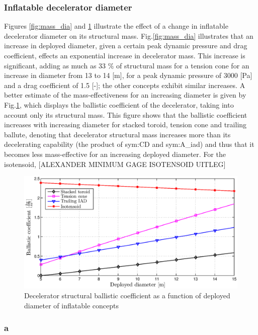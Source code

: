 \subsubsection{Inflatable decelerator diameter}
Figures \ref{fig:mass_dia} and \ref{fig:bc_dia} illustrate the effect of a change in inflatable decelerator diameter on its structural mass. Fig.\ref{fig:mass_dia} illustrates that an increase in deployed diameter, given a certain peak dynamic pressure and drag coefficient, effects an exponential increase in decelerator mass. This increase is significant, adding as much as 33 $\%$ of structural mass for a tension cone for an increase in diameter from 13 to 14 [m], for a peak dynamic pressure of 3000 [Pa] and a drag coefficient of 1.5 [-]; the other concepts exhibit similar increases. A better estimate of the mass-effectiveness for an increasing diameter is given by Fig.\ref{fig:bc_dia}, which displays the ballistic coefficient of the decelerator, taking into account only its structural mass. This figure shows that the ballistic coefficient increases with increasing diameter for stacked toroid, tension cone and trailing ballute, denoting that decelerator structural mass increases more than its decelerating capability (the product of \gls{sym:CD} and \gls{sym:A_iad}) and thus that it becomes less mass-effective for an increasing deployed diameter. For the isotensoid, [ALEXANDER MINIMUM GAGE ISOTENSOID UITLEG]

\begin{figure}[H]
\centering
\includegraphics[width = 1.0\textwidth]{Figure/bc_dia.eps}
\caption{Decelerator structural ballistic coefficient as a function of deployed diameter of inflatable concepts}
\label{fig:bc_dia}
\end{figure}

\subsubsection{a}

